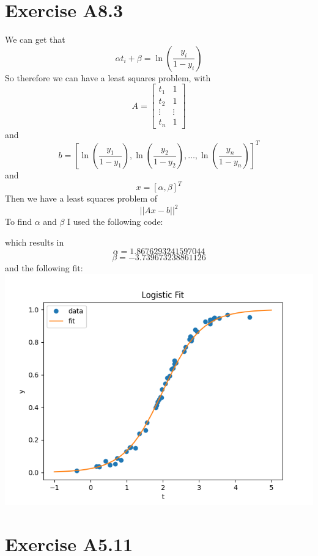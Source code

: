 \section*{Exercise A8.3}
We can get that 
$$\alpha t_i+\beta=\ln(\frac{y_i}{1-y_i})$$
So therefore we can have a least squares problem, with
$$A=\begin{bmatrix}
t_1 & 1\\
t_2 & 1\\
\vdots & \vdots\\
t_n & 1
\end{bmatrix}$$
and 
$$b=[\ln(\frac{y_1}{1-y_1}),\ln(\frac{y_2}{1-y_2}),\dots,\ln(\frac{y_n}{1-y_n})]^T$$
and
$$x=[\alpha,\beta]^T$$
Then we have a least squares problem of 
$$||Ax-b||^2$$
To find $\alpha$ and $\beta$ I used the following code:

which results in
$$\alpha=1.8676293241597044$$
$$\beta=-3.739673238861126$$
and the following fit:\\  
\includegraphics[scale=0.5]{"fig2.png"}
\section*{Exercise A5.11}
